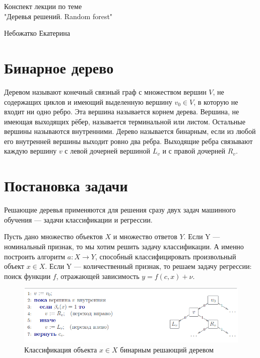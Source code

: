 \documentclass[14pt, a4paper]{article}
\begin{document}
\thispagestyle{empty}
\medskip
\vfill

\begin{center}
\Large{ Конспект лекции по теме \\"Деревья решений. Random forest"\\}
\end{center}

\medskip

\begin{center}
\large{ Небожатко Екатерина}
\end{center}







\newpage
\tableofcontents

\newpage

\section{Бинарное дерево}
Деревом называют конечный связный граф с множеством вершин $V$, не содержащих циклов и имеющий выделенную вершину $v_0 \in V$, в которую не входит ни одно ребро. Эта вершина называется корнем дерева.  Вершина, не имеющая выходящих рёбер, называется терминальной или листом. Остальные вершины называются внутренними. Дерево называется бинарным, если из любой его внутренней вершины выходит ровно два ребра. Выходящие ребра связывают каждую вершину $v$ с левой дочерней вершиной $L_v$ и с правой дочерней $R_v$. 


\section{Постановка задачи}
Решающие деревья применяются для решения сразу двух задач машинного обучения --- задачи классификации и регрессии. 

Пусть дано множество объектов $X$ и множество ответов $Y$. Если Y --- номинальный признак, то мы хотим решить задачу классификации. А именно построить алгоритм $a:X \rightarrow Y$, способный классифицировать произвольный объект $x \in X$. Если Y --- количественный признак, то решаем задачу регрессии: поиск функции $f$, отражающей зависимость 
$y = f(c, x) + \nu$.


\begin{figure}[h!]
\label{fig:class_ex}
\centering
\includegraphics[scale=0.5]{bin_class}
\caption{Классификация объекта $x \in X$ бинарным решающий деревом}
\end{figure}
\end{document}
